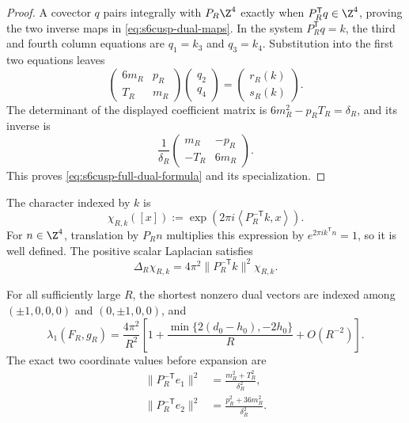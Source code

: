 \begin{proof}
A covector \(q\) pairs integrally with \(P_R\Z^4\) exactly when
\(P_R^{\mathsf T}q\in\Z^4\), proving the two inverse maps in
\eqref{eq:s6cusp-dual-maps}.  In the system \(P_R^{\mathsf T}q=k\), the
third and fourth column equations are
\(q_1=k_3\) and \(q_3=k_4\).  Substitution into the first two equations
leaves
\[
 \begin{pmatrix}6m_R&p_R\\T_R&m_R\end{pmatrix}
 \begin{pmatrix}q_2\\q_4\end{pmatrix}
 =\begin{pmatrix}r_R(k)\\s_R(k)\end{pmatrix}.
\]
The determinant of the displayed coefficient matrix is
\(6m_R^2-p_RT_R=\delta_R\), and its inverse is
\[
 \frac1{\delta_R}
 \begin{pmatrix}m_R&-p_R\\-T_R&6m_R\end{pmatrix}.
\]
This proves \eqref{eq:s6cusp-full-dual-formula} and its specialization.
\end{proof}

The character indexed by \(k\) is
\begin{equation}\label{eq:s6cusp-character}
 \chi_{R,k}([x]):=
 \exp\!\left(2\pi i\left\langle P_R^{-\mathsf T}k,x\right\rangle\right).
\end{equation}
For \(n\in\Z^4\), translation by \(P_Rn\) multiplies this expression by
\(e^{2\pi i k^{\mathsf T}n}=1\), so it is well defined.  The positive
scalar Laplacian satisfies
\begin{equation}\label{eq:s6cusp-character-eigenvalue}
 \Delta_R\chi_{R,k}=
 4\pi^2\lVert P_R^{-\mathsf T}k\rVert^2\chi_{R,k}.
\end{equation}

\begin{theorem}
\label{thm:s6cusp-sharp-scalar-spectrum}
For all sufficiently large \(R\), the shortest nonzero dual vectors are
indexed among
\((\pm1,0,0,0)\) and \((0,\pm1,0,0)\), and
\begin{equation}\label{eq:s6cusp-first-eigenvalue-correction}
 \lambda_1(F_R,g_R)=\frac{4\pi^2}{R^2}
 \left[
 1+\frac{\min\{2(d_0-h_0),-2h_0\}}{R}
 +O(R^{-2})
 \right].
\end{equation}
The exact two coordinate values before expansion are
\begin{align}
 \lVert P_R^{-\mathsf T}e_1\rVert^2
 &=\frac{m_R^2+T_R^2}{\delta_R^2},
 \label{eq:s6cusp-e1-exact}\\
 \lVert P_R^{-\mathsf T}e_2\rVert^2
 &=\frac{p_R^2+36m_R^2}{\delta_R^2}.
 \label{eq:s6cusp-e2-exact}
\end{align}
\end{theorem}

